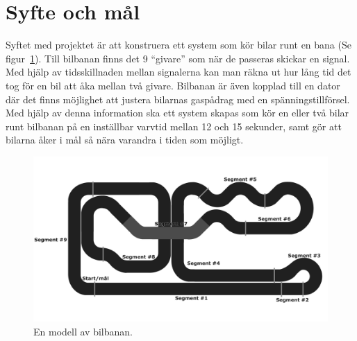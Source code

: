 \section{Syfte och mål}

Syftet med projektet är att konstruera ett system som kör bilar runt en
bana (Se figur~\ref{fig:track_modell}). Till bilbanan finns det 9 ``givare'' som när de passeras skickar en
signal. Med hjälp av tidsskillnaden mellan signalerna kan man räkna ut hur lång
tid det tog för en bil att åka mellan två givare. Bilbanan är även kopplad till
en dator där det finns möjlighet att justera bilarnas gaspådrag med en
spänningstillförsel. Med hjälp av denna information ska ett system skapas som
kör en eller två bilar runt bilbanan på en inställbar varvtid mellan 12 och 15
sekunder, samt gör att bilarna åker i mål så nära varandra i tiden som möjligt.

\begin{figure}
  \centering
  \includegraphics{figures/BanaModell.pdf}
  \caption{En modell av bilbanan.}
  \label{fig:track_modell}
\end{figure}